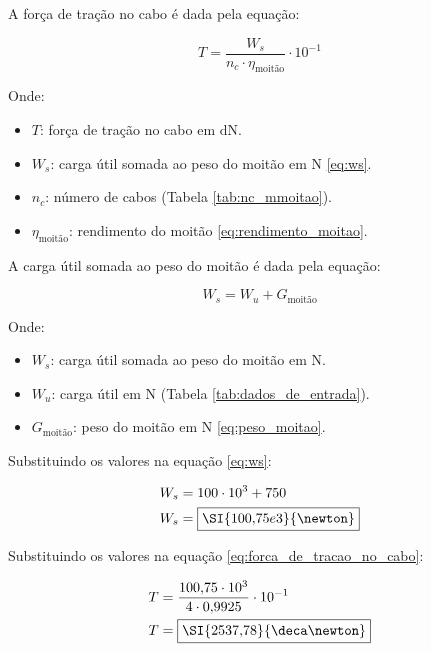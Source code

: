 A força de tração no cabo é dada pela equação:

\begin{equation}
  T = \frac{W_s}{n_c \cdot \eta_{\text{moitão}}} \cdot 10^{-1}
  \label{eq:forca_de_tracao_no_cabo}
\end{equation}

Onde:

\begin{itemize}[leftmargin=1.25cm]
  \item $T$: força de tração no cabo em $\si{\deca\newton}$.
  \item $W_s$: carga útil somada ao peso do moitão em $\si{\newton}$ \eqref{eq:ws}.
  \item $n_c$: número de cabos (Tabela \ref{tab:nc_mmoitao}).
  \item $\eta_{\text{moitão}}$: rendimento do moitão \eqref{eq:rendimento_moitao}.
\end{itemize}

\vspace{1em}

A carga útil somada ao peso do moitão é dada pela equação:

\begin{equation}
  W_s = W_u + G_{\text{moitão}}
  \label{eq:ws}
\end{equation}

Onde:

\begin{itemize}[leftmargin=1.25cm]
  \item $W_s$: carga útil somada ao peso do moitão em $\si{\newton}$.
  \item $W_u$: carga útil em $\si{\newton}$ (Tabela \ref{tab:dados_de_entrada}).
  \item $G_{\text{moitão}}$: peso do moitão em $\si{\newton}$ \eqref{eq:peso_moitao}.
\end{itemize}

\vspace{1em}

Substituindo os valores na equação \eqref{eq:ws}:

\begin{align*}
  W_s & = 100 \cdot 10^3 + 750           \\
  W_s & = \boxed{\SI{100{,}75e3}{\newton}}
\end{align*}

Substituindo os valores na equação \eqref{eq:forca_de_tracao_no_cabo}:

\begin{align*}
  T & = \frac{100{,}75 \cdot 10^3}{4 \cdot 0{,}9925} \cdot 10^{-1} \\
  T & = \boxed{\SI{2537{,}78}{\deca\newton}}
\end{align*}
